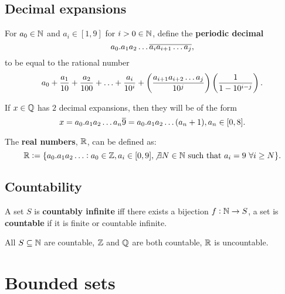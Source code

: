 \subsection{Decimal expansions}

\begingroup\belowdisplayskip=-0pt

\begin{definition}
    For $a_0\in\mathbb{N}$ and $a_i\in[1,9]$ for $i>0\in\mathbb{N}$, define the \textbf{periodic decimal} \[
        a_0.a_1a_2\ldots\overline{a_ia_{i+1}\ldots a_j}
    \textcolor{black}{,}
    \] to be equal to the rational number \[
        a_0 + \frac{a_1}{10} + \frac{a_2}{100} + \ldots + \frac{a_i}{10^i} + \br{\frac{a_{i+1}a_{i+2}\ldots a_j}{10^j}}\br{\frac{1}{1-10^{i-j}}}
    \textcolor{black}{.}
    \]
\end{definition}

\endgroup
\begingroup\belowdisplayskip=-10pt

\begin{theorem}
    If $x\in\mathbb{Q}$ has $2$ decimal expansions, then they will be of the form \[
        x=a_0.a_1a_2\ldots a_n\overline{9} = a_0.a_1a_2\ldots(a_n+1), a_n\in[0,8]
    \textcolor{black}{.}    
    \]
\end{theorem}

\begin{definition}
    The \textbf{real numbers}, $\mathbb{R}$, can be defined as: \[
        \mathbb{R}:= \{a_0.a_1a_2\ldots : a_0\in\mathbb{Z}, a_i\in[0,9],\not\exists N\in\mathbb{N} \ \text{\textcolor{black}{such that }} a_i=9 \ \forall i\geq N\}
    \textcolor{black}{.}
    \]
\end{definition}

\endgroup

\subsection{Countability}

\begin{definition}[Countability]
    A set $S$ is \textbf{countably infinite} iff there exists a bijection $f:\mathbb{N}\rightarrow S$, a set is \textbf{countable} if it is finite or countable infinite.
\end{definition}

\begin{theorem}
    All $S\subseteq\mathbb{N}$ are countable, $\mathbb{Z}$ and $\mathbb{Q}$ are both countable, $\mathbb{R}$ is uncountable.
\end{theorem}

\section{Bounded sets}

